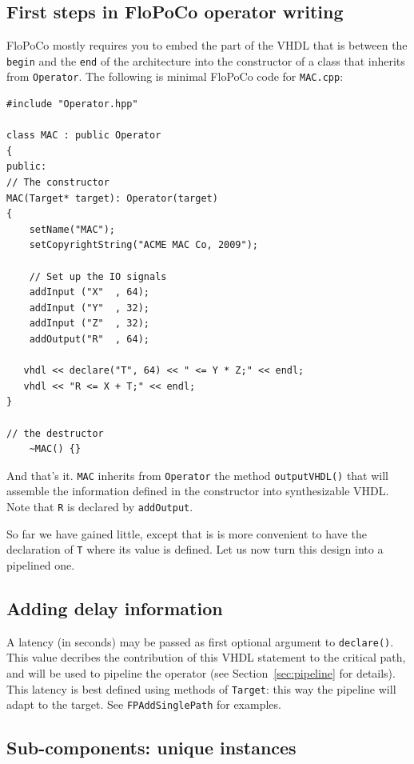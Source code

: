 \documentclass{article}
\begin{document}
\subsection{First steps in FloPoCo operator writing}

FloPoCo mostly requires you to embed the part of the VHDL that is between the \texttt{begin} and the \texttt{end} of the architecture
into the constructor of a class that inherits from
\verb!Operator!. The following is minimal FloPoCo code for
\verb!MAC.cpp!:
\begin{verbatim}
#include "Operator.hpp"

class MAC : public Operator
{
public:
// The constructor
MAC(Target* target): Operator(target)
{
	setName("MAC");
	setCopyrightString("ACME MAC Co, 2009");		

	// Set up the IO signals
	addInput ("X"  , 64);
	addInput ("Y"  , 32);
	addInput ("Z"  , 32);
	addOutput("R"  , 64);

   vhdl << declare("T", 64) << " <= Y * Z;" << endl;
   vhdl << "R <= X + T;" << endl;
}

// the destructor
	~MAC() {}
\end{verbatim}
 
And that's it. \verb!MAC! inherits from \verb!Operator! the method
\verb!outputVHDL()! that will assemble the information defined in the
constructor into synthesizable VHDL. Note that \verb!R! is declared by \verb!addOutput!.

So far we have gained little, except that is is more convenient to
have the declaration of \verb!T! where its value is defined. Let us
now turn this design into a pipelined one.

\subsection{Adding delay information}
A latency (in seconds) may be passed as first optional argument to  \texttt{declare()}.
  This value decribes the contribution of this VHDL statement to the critical path, and will be used to pipeline the operator (see Section~\ref{sec:pipeline} for details).
  This latency is best defined using methods of \texttt{Target}: this way the pipeline will adapt to the target.
  See \texttt{FPAddSinglePath} for examples.

\subsection{Sub-components: unique instances}
\end{document}
